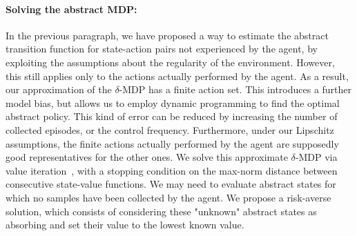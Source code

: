 \paragraph{Solving the abstract MDP:}
In the previous paragraph, we have proposed a way to estimate the abstract transition function for state-action pairs not experienced by the agent, by exploiting the assumptions about the regularity of the environment. However, this still applies only to the actions actually performed by the agent. As a result, our approximation of the $\delta$-MDP has a finite action set. This introduces a further model bias, but allows us to employ dynamic programming to find the optimal abstract policy. This kind of error can be reduced by increasing the number of collected episodes, or the control frequency. Furthermore, under our Lipschitz assumptions, the finite actions actually performed by the agent are supposedly good representatives for the other ones.
We solve this approximate $\delta$-MDP via value iteration~\citep{bertsekas1996neuro}, with a stopping condition on the max-norm distance between consecutive state-value functions.
We may need to evaluate abstract states for which no samples have been collected by the agent. We propose a risk-averse solution, which consists of considering these "unknown" abstract states as absorbing and set their value to the lowest known value. 

